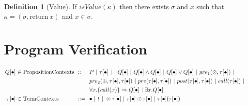 \documentclass[10pt]{article}
\newcommand{\forallc}[1]{\forall x. \{call(x)\} \Rightarrow #1}
\theoremstyle{definition}
\newtheorem{definition}{Definition}
\begin{document}
\vspace{2em}

\begin{definition}[Value] 
  If $isValue(\kappa)$ then there exists $\sigma$ and $x$ such that $\kappa = (\sigma, \text{return}~x)$
  and $x \in \sigma$.
\end{definition}

\newpage

\section{Program Verification}

\[ \arraycolsep=1.6pt\def\arraystretch{1.3}
\begin{array}{rclcl}
  Q[\bullet] &\in& \text{PropositionContexts} &~::=~& P ~|~ \tau[\bullet] ~|~ \neg Q[\bullet] ~|~ Q[\bullet] \wedge Q[\bullet] ~|~
          Q[\bullet] \vee Q[\bullet] ~|~
                                       pre_1(\otimes,\tau[\bullet]) ~|~ \\
      & & & & pre_2(\oplus,\tau[\bullet],\tau[\bullet]) ~|~ pre(\tau[\bullet],\tau[\bullet]) ~|~ post(\tau[\bullet],\tau[\bullet]) ~|~ call(\tau[\bullet]) ~|~\\
      &                 & & &  \forallc{Q[\bullet]} ~|~ \exists x. Q[\bullet] \\
  \tau[\bullet] &\in& \text{TermContexts} &~::=~& \bullet ~|~ t ~|~ \otimes \tau[\bullet] ~|~ \tau[\bullet] \oplus \tau[\bullet] ~|~ \tau[\bullet](\tau[\bullet]) \\
\end{array} \]
\end{document}
